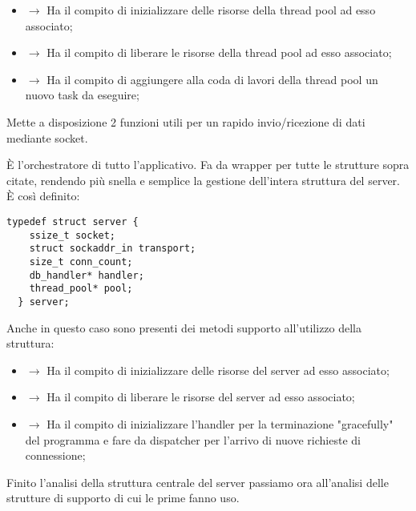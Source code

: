   \begin{itemize}
    \item {} $\rightarrow$ Ha il compito di inizializzare delle risorse della thread pool ad esso associato;
    \item {} $\rightarrow$ Ha il compito di liberare le risorse della thread pool ad esso associato;
    \item {} $\rightarrow$ Ha il compito di aggiungere alla coda di lavori della thread pool un nuovo task da eseguire;
  \end{itemize}

  \begin{center}  \end{center}
  Mette a disposizione 2 funzioni utili per un rapido invio/ricezione di dati mediante socket.

  \begin{center}  \end{center}
  È l'orchestratore di tutto l'applicativo. Fa da wrapper per tutte le strutture sopra citate, rendendo più snella e semplice la gestione dell'intera struttura del server. È così definito:

  \begin{lstlisting}[language={[POSIX]C}, style=wnumbers]
  typedef struct server {
    ssize_t socket;
    struct sockaddr_in transport;
    size_t conn_count;
    db_handler* handler;
    thread_pool* pool;
  } server;
  \end{lstlisting}

  Anche in questo caso sono presenti dei metodi supporto all'utilizzo della struttura:

  \begin{itemize}
    \item {} $\rightarrow$ Ha il compito di inizializzare delle risorse del server ad esso associato;
    \item {} $\rightarrow$ Ha il compito di liberare le risorse del server ad esso associato;
    \item {} $\rightarrow$ Ha il compito di inizializzare l'handler per la terminazione "gracefully" del programma e fare da dispatcher per l'arrivo di nuove richieste di connessione;
  \end{itemize}

  Finito l'analisi della struttura centrale del server passiamo ora all'analisi delle strutture di supporto di cui le prime fanno uso.

